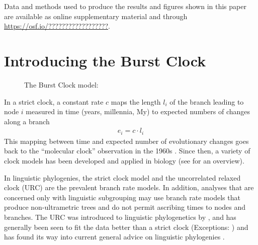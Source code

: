 \documentclass[a4paper,12pt]{scrartcl}
\begin{document}
Data and methods used to produce the results and figures shown in this paper are
available as online supplementary material and through
\url{https://osf.io/??????????????????}.

\section{Introducing the Burst Clock}
\begin{figure}
    \centering
    \caption{The Burst Clock model: }
    \label{fig:burstclock}
\end{figure}
\label{sec:description}
In a strict clock,
a constant rate $c$ maps the length $l_i$ of the branch leading to node $i$
measured in time (years, millennia, My) to expected numbers of changes
along a branch
\begin{align}
  e_i = c \cdot l_i
  \label{eq:strict}
\end{align}
This mapping between time and expected number of evolutionary changes goes back
to the “molecular clock” observation in the 1960s
\parencite{zuckerkandl1965evolutionary}. Since then, a variety of clock models
has been developed and applied in biology (see \textcite{ho2014molecularclock} for an
overview).

In linguistic phylogenies, the strict clock model and the uncorrelated relaxed
clock (URC) are the prevalent branch rate models. In addition, analyses that are
concerned only with linguistic subgrouping may use branch rate models that
produce non-ultrametric trees and do not permit ascribing times to nodes and
branches. The URC \parencite{drummond2006relaxed} was introduced to linguistic
phylogenetics by \textcite{kitchen2009bayesian}, and has generally been seen to
fit the data better than a strict clock
\parencite{bouckaert2012mapping,honkola2013cultural,lee2013evolution}
(Exceptions: \textcite{savelyev2020bayesian,kaiping2021systematic})
and has found its way into current general advice on linguistic phylogenies
\parencite{maurits2017beastling,hoffmann2021bayesian}.
\end{document}
